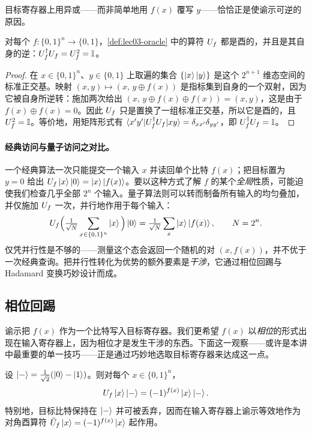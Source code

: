 目标寄存器上用异或——而非简单地用 $f(x)$ 覆写 $y$——恰恰正是使谕示可逆的原因。

\begin{lemma}[谕示是酉的]
\label{lem:lec03-unitary}
对每个 $f:\{0,1\}^n\to\{0,1\}$，\cref{def:lec03-oracle} 中的算符 $U_{f}$ 都是酉的，并且是其自身的逆：$U_{f}^{\dagger}U_{f}=U_{f}^2=\mathbb{I}$。
\end{lemma}

\begin{proof}
在 $x\in\{0,1\}^n$、$y\in\{0,1\}$ 上取遍的集合 $\{\ket{x}\ket{y}\}$ 是这个 $2^{n+1}$ 维态空间的标准正交基。映射 $(x,y)\mapsto(x,\,y\oplus f(x))$ 是指标集到自身的一个双射，因为它被自身所逆转：施加两次给出 $(x,\,y\oplus f(x)\oplus f(x))=(x,y)$，这是由于 $f(x)\oplus f(x)=0$。因此 $U_{f}$ 只是置换了一组标准正交基，所以它是酉的，且 $U_{f}^2=\mathbb{I}$。等价地，用矩阵形式有 $\braket{x'y'|U_{f}^{\dagger}U_{f}|xy}=\delta_{xx'}\delta_{yy'}$，即 $U_{f}^{\dagger}U_{f}=\mathbb{I}$。
\end{proof}

\paragraph{经典访问与量子访问之对比。}
一个经典算法一次只能提交一个输入 $x$ 并读回单个比特 $f(x)$；把目标置为 $y=0$ 给出 $U_{f}\ket{x}\ket{0}=\ket{x}\ket{f(x)}$。要以这种方式了解 $f$ 的某个\emph{全局}性质，可能迫使我们检查几乎全部 $2^n$ 个输入。量子算法则可以转而制备所有输入的均匀叠加，并仅施加 $U_{f}$ 一次，并行地作用于每个输入：
\[
  U_{f}\Big(\tfrac{1}{\sqrt{N}}\sum_{x\in\{0,1\}^n}\ket{x}\Big)\ket{0}
  =\tfrac{1}{\sqrt{N}}\sum_{x}\ket{x}\ket{f(x)},
  \qquad N=2^n.
\]
仅凭并行性是不够的——测量这个态会返回一个随机的对 $(x,f(x))$，并不优于一次经典查询。把并行性转化为优势的额外要素是\emph{干涉}，它通过相位回踢与 Hadamard 变换巧妙设计而成。

\subsection{相位回踢}

谕示把 $f(x)$ 作为一个比特写入目标寄存器。我们更希望 $f(x)$ 以\emph{相位}的形式出现在输入寄存器上，因为相位才是发生干涉的东西。下面这一观察——或许是本讲中最重要的单一技巧——正是通过巧妙地选取目标寄存器来达成这一点。

\begin{lemma}[相位回踢]
\label{lem:lec03-kickback}
设 $\ket{-}=\tfrac{1}{\sqrt2}(\ket{0}-\ket{1})$。则对每个 $x\in\{0,1\}^n$，
\[
  U_{f}\ket{x}\ket{-}=(-1)^{f(x)}\ket{x}\ket{-}.
\]
特别地，目标比特保持在 $\ket{-}$ 并可被丢弃，因而在输入寄存器上谕示等效地作为对角酉算符 $\tilde U_f\ket{x}=(-1)^{f(x)}\ket{x}$ 起作用。
\end{lemma}

